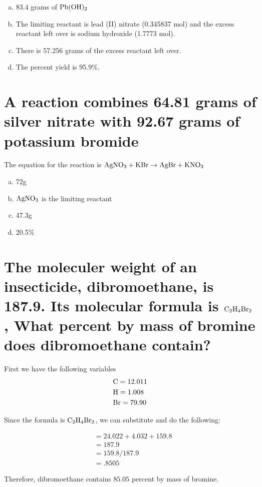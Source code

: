 \documentclass{scrartcl}
\begin{document}
\begin{enumerate}[a.]
\item 83.4 grams of \(\ce{Pb(OH)2}\)
\item The limiting reactant is lead (II) nitrate (0.345837 mol) and the excess reactant left over is sodium hydroxide (1.7773 mol).
\item There is 57.256 grams of the excess reactant left over.
\item The percent yield is 95.9\%.
\end{enumerate}

\section{A reaction combines 64.81 grams of silver nitrate with 92.67 grams of potassium bromide}
\label{sec:org37cc2f2}
The equation for the reaction is
\(\ce{AgNO3}+\ce{KBr}\rightarrow\ce{AgBr}+\ce{KNO3}\)

\begin{enumerate}[a.]
\item 72g
\item \(\ce{AgNO3}\) is the limiting reactant
\item 47.3g
\item 20.5\%
\end{enumerate}

\section{The moleculer weight of an insecticide, dibromoethane, is 187.9. Its molecular formula is \(\ce{C2H4Br2}\), What percent by mass of bromine does dibromoethane contain?}
\label{sec:org8b6d8ea}
First we have the following variables
\begin{align*}
&\ce{C} = 12.011\\
&\ce{H} = 1.008\\
&\ce{Br} = 79.90
\end{align*}

Since the formula is  \(\ce{C2H4Br2}\), we can substitute and do the following:

\begin{align*}
&= 24.022 + 4.032 + 159.8\\
&= 187.9\\
&= 159.8/187.9\\
&=.8505
\end{align*}

Therefore, dibromoethane contains \(85.05\) percent by mass of bromine.
\end{document}
